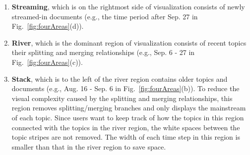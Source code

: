 \begin{enumerate}

\item \textbf{\normalsize Streaming}, which is on the rightmost side of  visualization\kg{,} consists of newly streamed-in documents (e.g., the time period after Sep. 27  in Fig.~\ref{fig:fourAreas}(d)).

\item \textbf{\normalsize River}, which is the dominant region of  visualization\kg{,} consists of recent topics  their splitting and merging relationships (e.g., Sep. 6 - 27 in Fig.~\ref{fig:fourAreas}(c)).

\item \textbf{\normalsize Stack}, which is to the left of the river region\kg{,} contains older topics and documents (e.g., Aug. 16 - Sep. 6 in Fig.~\ref{fig:fourAreas}(b)).
To reduce the visual complexity caused by the splitting and merging relationships, this region removes splitting/merging branches and only displays the mainstream of each topic.
Since users want to keep track of how the topics in this region connected with the topics in the river region, the white spaces between the topic stripes are not removed.
The width of each time step in this region is smaller than that in the river region to save space.


\end{enumerate}
